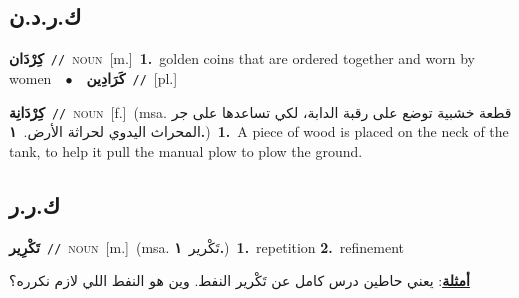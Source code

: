 \documentclass[10pt,a4paper,twoside]{article} %
\begin{document}
\begin{multicols}{2}
\vspace{-3mm}
\subsection*{\color{blue}\foreignlanguage{arabic}{ك.ر.د.ن}\color{blue}{}} 

{\setlength\topsep{0pt}\textbf{\foreignlanguage{arabic}{كِرْدَان}}\ {\color{gray}\texttt{//}\color{black}}\ \textsc{noun}\ [m.]\ \textbf{1.}~golden coins that are ordered together and worn by women\ \ $\bullet$\ \ \setlength\topsep{0pt}\textbf{\foreignlanguage{arabic}{كَرَادِين}}\ {\color{gray}\texttt{//}\color{black}}\ [pl.]\ } \vspace{2mm}

{\setlength\topsep{0pt}\textbf{\foreignlanguage{arabic}{كِرْدَانِة}}\ {\color{gray}\texttt{//}\color{black}}\ \textsc{noun}\ [f.]\ \color{gray}(msa. \foreignlanguage{arabic}{قطعة خشبية توضع على رقبة الدابة، لكي تساعدها على جر المحراث اليدوي لحراثة الأرض.}~\foreignlanguage{arabic}{\textbf{١.}})\color{black}\ \textbf{1.}~A piece of wood is placed on the neck of the tank, to help it pull the manual plow to plow the ground.\ } \vspace{2mm}

\vspace{-3mm}
\subsection*{\color{blue}\foreignlanguage{arabic}{ك.ر.ر}\color{blue}{}} 

{\setlength\topsep{0pt}\textbf{\foreignlanguage{arabic}{تَكْرِير}}\ {\color{gray}\texttt{//}\color{black}}\ \textsc{noun}\ [m.]\ \color{gray}(msa. \foreignlanguage{arabic}{تَكْرير}~\foreignlanguage{arabic}{\textbf{١.}})\color{black}\ \textbf{1.}~repetition  \textbf{2.}~refinement\  \begin{flushright}\color{gray}\foreignlanguage{arabic}{\textbf{\underline{\foreignlanguage{arabic}{أمثلة}}}: يعني حاطين درس كامل عن تَكْرير النفط. وين هو النفط اللي لازم نكرره؟}\end{flushright}\color{black}} \vspace{2mm}


\end{multicols}
\end{document}
